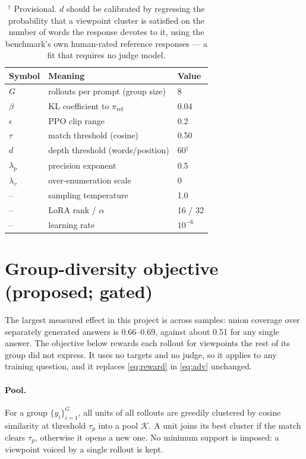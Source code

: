 \documentclass[11pt]{article}
\newcommand{\polref}{\pi_{\mathrm{ref}}}
\begin{document}
\begin{table}[h]
\centering
\begin{tabular}{@{}lll@{}}
\toprule
Symbol & Meaning & Value \\
\midrule
$G$ & rollouts per prompt (group size) & 8 \\
$\beta$ & KL coefficient to $\polref$ & 0.04 \\
$\epsilon$ & PPO clip range & 0.2 \\
$\tau$ & match threshold (cosine) & 0.50 \\
$d$ & depth threshold (words/position) & 60$^{\dagger}$ \\
$\lambda_p$ & precision exponent & 0.5 \\
$\lambda_v$ & over-enumeration scale & 0 \\
-- & sampling temperature & 1.0 \\
-- & LoRA rank / $\alpha$ & 16 / 32 \\
-- & learning rate & $10^{-6}$ \\
\bottomrule
\end{tabular}
\caption{$^{\dagger}$ Provisional. $d$ should be calibrated by regressing the
probability that a viewpoint cluster is satisfied on the number of words the
response devotes to it, using the benchmark's own human-rated reference
responses --- a fit that requires no judge model.}
\end{table}

\section{Group-diversity objective (proposed; gated)}\label{sec:group}

The largest measured effect in this project is across samples: union coverage
over separately generated answers is 0.66--0.69, against about 0.51 for any single
answer. The objective below rewards each rollout for viewpoints the rest of its
group did not express. It uses no targets and no judge, so it applies to any
training question, and it replaces \eqref{eq:reward} in \eqref{eq:adv} unchanged.

\paragraph{Pool.} For a group $\{y_i\}_{i=1}^G$, all units of all rollouts are
greedily clustered by cosine similarity at threshold $\tau_p$ into a pool
$\mathcal{K}$. A unit joins its best cluster if the match clears $\tau_p$,
otherwise it opens a new one. No minimum support is imposed: a viewpoint voiced
by a single rollout is kept.
\end{document}
